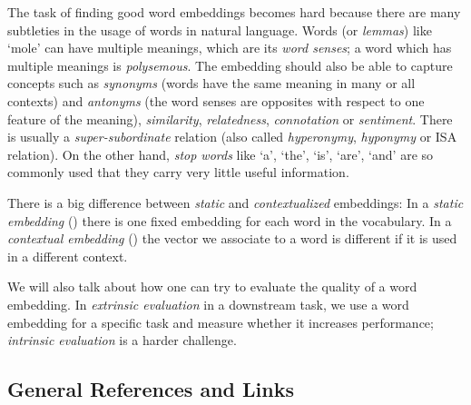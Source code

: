 \documentclass[11pt, a4paper]{amsart}
\begin{document}
The task of finding good word embeddings becomes hard because there are many subtleties in the usage of words in natural language.
Words (or \emph{lemmas}) like `mole' can have multiple meanings, which are its \emph{word senses}; a word which has multiple meanings is \emph{polysemous}.
The embedding should also be able to capture concepts such as \emph{synonyms} (words have the same meaning in many or all contexts) and \emph{antonyms} (the word senses are opposites with respect to one feature of the meaning), \emph{similarity}, \emph{relatedness}, \emph{connotation} or \emph{sentiment}.
There is usually a \emph{super-subordinate} relation (also called \emph{hyperonymy}, \emph{hyponymy} or ISA relation).
On the other hand, \emph{stop words} like `a', `the', `is', `are', `and' are so commonly used that they carry very little useful information.

There is a big difference between \emph{static} and \emph{contextualized} embeddings:
In a \emph{static embedding} () there is one fixed embedding for each word in the vocabulary.
In a \emph{contextual embedding} () the vector we associate to a word is different if it is used in a different context.

We will also talk about how one can try to evaluate the quality of a word embedding.
In \emph{extrinsic evaluation} in a downstream task, we use a word embedding for a specific task and measure whether it increases performance; \emph{intrinsic evaluation} is a harder challenge.

\subsection{General References and Links}
\label{sec:general_references}
\end{document}
